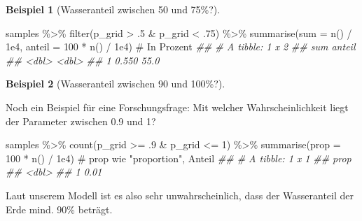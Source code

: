 \documentclass[
  a4paper,
  DIV=11]{scrreprt}
\newenvironment{Shaded}{\begin{snugshade}}{\end{snugshade}}
\newcommand{\AttributeTok}[1]{\textcolor[rgb]{0.40,0.45,0.13}{#1}}
\newcommand{\CommentTok}[1]{\textcolor[rgb]{0.37,0.37,0.37}{#1}}
\newcommand{\DecValTok}[1]{\textcolor[rgb]{0.68,0.00,0.00}{#1}}
\newcommand{\DocumentationTok}[1]{\textcolor[rgb]{0.37,0.37,0.37}{\textit{#1}}}
\newcommand{\FloatTok}[1]{\textcolor[rgb]{0.68,0.00,0.00}{#1}}
\newcommand{\FunctionTok}[1]{\textcolor[rgb]{0.28,0.35,0.67}{#1}}
\newcommand{\NormalTok}[1]{\textcolor[rgb]{0.00,0.23,0.31}{#1}}
\newcommand{\SpecialCharTok}[1]{\textcolor[rgb]{0.37,0.37,0.37}{#1}}
\theoremstyle{definition}
\newtheorem{example}{Beispiel}[chapter]
\theoremstyle{remark}
\begin{document}
\begin{example}[Wasseranteil zwischen 50 und 75\%?]
\begin{Shaded}
\begin{Highlighting}[]
\NormalTok{samples }\SpecialCharTok{\%\textgreater{}\%} 
  \FunctionTok{filter}\NormalTok{(p\_grid }\SpecialCharTok{\textgreater{}}\NormalTok{ .}\DecValTok{5} \SpecialCharTok{\&}\NormalTok{ p\_grid }\SpecialCharTok{\textless{}}\NormalTok{ .}\DecValTok{75}\NormalTok{) }\SpecialCharTok{\%\textgreater{}\%} 
  \FunctionTok{summarise}\NormalTok{(}\AttributeTok{sum     =}       \FunctionTok{n}\NormalTok{() }\SpecialCharTok{/} \FloatTok{1e4}\NormalTok{,}
            \AttributeTok{anteil =} \DecValTok{100} \SpecialCharTok{*} \FunctionTok{n}\NormalTok{() }\SpecialCharTok{/} \FloatTok{1e4}\NormalTok{)  }\CommentTok{\# In Prozent}
\DocumentationTok{\#\# \# A tibble: 1 x 2}
\DocumentationTok{\#\#     sum anteil}
\DocumentationTok{\#\#   \textless{}dbl\textgreater{}  \textless{}dbl\textgreater{}}
\DocumentationTok{\#\# 1 0.550   55.0}
\end{Highlighting}
\end{Shaded}

\end{example}

\leavevmode{}%
\begin{example}[Wasseranteil zwischen 90 und 100\%?]\label{exm-param3}

Noch ein Beispiel für eine Forschungsfrage: Mit welcher
Wahrscheinlichkeit liegt der Parameter zwischen 0.9 und 1?

\begin{Shaded}
\begin{Highlighting}[]
\NormalTok{samples }\SpecialCharTok{\%\textgreater{}\%} 
  \FunctionTok{count}\NormalTok{(p\_grid }\SpecialCharTok{\textgreater{}=}\NormalTok{ .}\DecValTok{9} \SpecialCharTok{\&}\NormalTok{ p\_grid }\SpecialCharTok{\textless{}=} \DecValTok{1}\NormalTok{) }\SpecialCharTok{\%\textgreater{}\%} 
  \FunctionTok{summarise}\NormalTok{(}\AttributeTok{prop =} \DecValTok{100} \SpecialCharTok{*} \FunctionTok{n}\NormalTok{() }\SpecialCharTok{/} \FloatTok{1e4}\NormalTok{)  }\CommentTok{\# prop wie "proportion", Anteil}
\DocumentationTok{\#\# \# A tibble: 1 x 1}
\DocumentationTok{\#\#    prop}
\DocumentationTok{\#\#   \textless{}dbl\textgreater{}}
\DocumentationTok{\#\# 1  0.01}
\end{Highlighting}
\end{Shaded}

Laut unserem Modell ist es also sehr unwahrscheinlich, dass der
Wasseranteil der Erde mind. 90\% beträgt.

\end{example}
\end{document}
